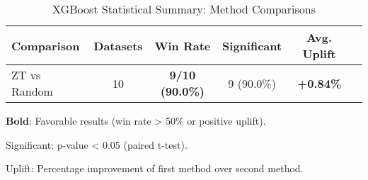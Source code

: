 \begin{table}[htbp]
\centering
\caption{XGBoost Statistical Summary: Method Comparisons}
\label{tab:xgboost_stats_summary}
\begin{tabular}{lccccc}
\toprule
Comparison & Datasets & Win Rate & Significant & Avg. Uplift \\
\midrule
ZT vs Random & 10 & \textbf{9/10 (90.0\%)} & 9 (90.0\%) & \textbf{+0.84\%} \\
\bottomrule
\end{tabular}
\begin{tablenotes}
\small
\item \textbf{Bold}: Favorable results (win rate > 50\% or positive uplift).
\item Significant: p-value < 0.05 (paired t-test).
\item Uplift: Percentage improvement of first method over second method.
\end{tablenotes}
\end{table}
